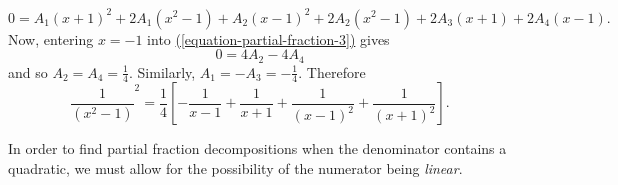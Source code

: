 \documentclass[10pt,]{book}
\theoremstyle{ptxplainnotitle}
\theoremstyle{ptxplaintitle}
\theoremstyle{ptxplainnotitle}
\theoremstyle{ptxplaintitle}
\theoremstyle{ptxplainnotitle}
\theoremstyle{ptxplaintitle}
\theoremstyle{ptxdefinitionnotitle}
\theoremstyle{ptxdefinitiontitle}
\theoremstyle{ptxdefinitionnotitle}
\theoremstyle{ptxdefinitiontitle}
\theoremstyle{ptxdefinitionnotitle}
\theoremstyle{ptxdefinitiontitle}
\theoremstyle{ptxdefinitionnotitle}
\theoremstyle{ptxdefinitiontitle}
\theoremstyle{ptxdefinitionnotitle}
\theoremstyle{ptxdefinitiontitle}
\numberwithin{equation}{section}
\begin{document}
\begin{example}
\begin{equation}
0 = A_{1}(x+1)^{2} + 2A_{1}(x^{2}-1) + A_{2}(x-1)^{2} + 2A_{2}(x^{2} - 1) + 2A_{3}(x+1) + 2A_{4}(x-1).\label{equation-partial-fraction-3}
\end{equation}
Now, entering \(x = -1\) into \hyperref[equation-partial-fraction-3]{(\ref{equation-partial-fraction-3})} gives%
\begin{equation*}
0 = 4A_{2} - 4A_{4}
\end{equation*}
and so \(A_{2} = A_{4} = \frac{1}{4}\). Similarly, \(A_{1} = - A_{3} = -\frac{1}{4}\). Therefore%
\begin{equation*}
\frac{1}{(x^{2} - 1)}^{2} = \frac{1}{4}\left[-\frac{1}{x-1} + \frac{1}{x+1} + \frac{1}{(x-1)^{2}} + \frac{1}{(x+1)^{2}}\right].
\end{equation*}
%
\end{example}
\hypertarget{p-559}{}%
In order to find partial fraction decompositions when the denominator contains a quadratic, we must allow for the possibility of the numerator being \emph{linear}.%
\end{document}
